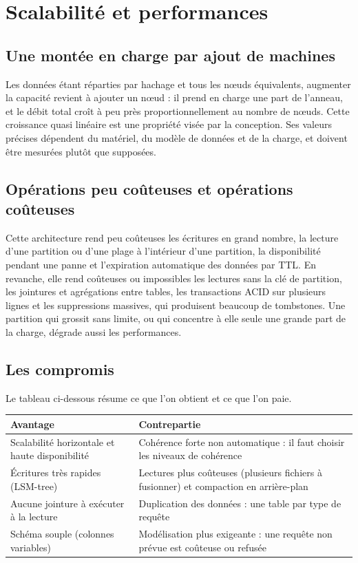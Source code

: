\documentclass[11pt,a4paper]{article}
\begin{document}
\section{Scalabilité et performances}

\subsection{Une montée en charge par ajout de machines}
Les données étant réparties par hachage et tous les nœuds équivalents, augmenter la capacité revient à ajouter un nœud : il prend en charge une part de l'anneau, et le débit total croît à peu près proportionnellement au nombre de nœuds. Cette croissance quasi linéaire est une propriété visée par la conception. Ses valeurs précises dépendent du matériel, du modèle de données et de la charge, et doivent être mesurées plutôt que supposées.

\subsection{Opérations peu coûteuses et opérations coûteuses}
Cette architecture rend peu coûteuses les écritures en grand nombre, la lecture d'une partition ou d'une plage à l'intérieur d'une partition, la disponibilité pendant une panne et l'expiration automatique des données par TTL. En revanche, elle rend coûteuses ou impossibles les lectures sans la clé de partition, les jointures et agrégations entre tables, les transactions ACID sur plusieurs lignes et les suppressions massives, qui produisent beaucoup de tombstones. Une partition qui grossit sans limite, ou qui concentre à elle seule une grande part de la charge, dégrade aussi les performances.

\subsection{Les compromis}
Le tableau ci-dessous résume ce que l'on obtient et ce que l'on paie.

\begin{center}
\small
\begin{tabularx}{\textwidth}{@{}>{\raggedright\arraybackslash}p{5.2cm}>{\raggedright\arraybackslash}X@{}}
\toprule
Avantage & Contrepartie \\
\midrule
Scalabilité horizontale et haute disponibilité & Cohérence forte non automatique : il faut choisir les niveaux de cohérence \\
Écritures très rapides (LSM-tree) & Lectures plus coûteuses (plusieurs fichiers à fusionner) et compaction en arrière-plan \\
Aucune jointure à exécuter à la lecture & Duplication des données : une table par type de requête \\
Schéma souple (colonnes variables) & Modélisation plus exigeante : une requête non prévue est coûteuse ou refusée \\
\bottomrule
\end{tabularx}
\end{center}
\end{document}
